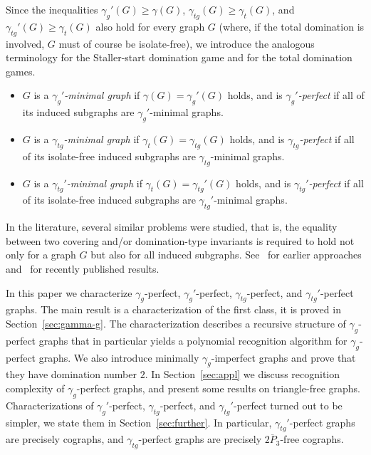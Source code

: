 \documentclass[12pt]{article}
\newcommand{\gtg}{\gamma_{tg}}
\begin{document}
Since the inequalities $\gamma_g'(G)\ge \gamma(G)$, $\gamma_{tg}(G)\ge \gamma_t(G)$, and $\gamma_{tg}'(G)\ge \gamma_t(G)$  also hold for every graph $G$ (where, if the total domination is involved, $G$ must of course be isolate-free), we introduce the analogous terminology for the Staller-start domination game and for the total domination games.
\begin{itemize}
 \item $G$ is a \emph{$\gamma_g'$-minimal graph} if $\gamma(G)=\gamma_g'(G)$ holds, and is \emph{$\gamma_g'$-perfect} if all of its induced subgraphs are $\gamma_g'$-minimal graphs. 
 \item $G$ is a \emph{$\gtg$-minimal graph} if $\gamma_t(G)=\gamma_{tg}(G)$ holds, and is \emph{$\gamma_{tg}$-perfect} if all of its isolate-free induced subgraphs are $\gtg$-minimal graphs. 
 \item $G$ is a \emph{$\gtg'$-minimal graph} if $\gamma_t(G)=\gamma_{tg}'(G)$ holds, and is \emph{$\gamma_{tg}'$-perfect} if all of its isolate-free induced subgraphs are $\gtg'$-minimal graphs.
\end{itemize}

In the literature, several similar problems were studied, that is, the equality between two covering and/or domination-type invariants is required to hold not only for a graph $G$ but also for all induced subgraphs. See~\cite{SM, ZZ} for earlier approaches and~\cite{ADR, ABBT, BB-2018, CP, HJR} for recently published results. 

In this paper we characterize $\gamma_g$-perfect, $\gamma_g'$-perfect, $\gamma_{tg}$-perfect, and $\gamma_{tg}'$-perfect graphs. The main result is a characterization of the first class, it is proved in Section~\ref{sec:gamma-g}. The characterization describes a recursive structure of $\gamma_g$-perfect graphs that in particular yields a polynomial recognition algorithm for $\gamma_g$-perfect graphs. We also introduce minimally $\gamma_g$-imperfect graphs and prove that they have domination number $2$. In Section~\ref{sec:appl} we discuss recognition complexity of $\gamma_g$-perfect graphs, and present some results on triangle-free graphs. Characterizations of $\gamma_g'$-perfect, $\gamma_{tg}$-perfect, and $\gamma_{tg}'$-perfect turned out to be simpler, we state them in Section~\ref{sec:further}. In particular, $\gamma_{tg}'$-perfect graphs are precisely cographs, and $\gamma_{tg}$-perfect graphs are precisely $\overline{2P_3}$-free cographs. 

\end{document}
